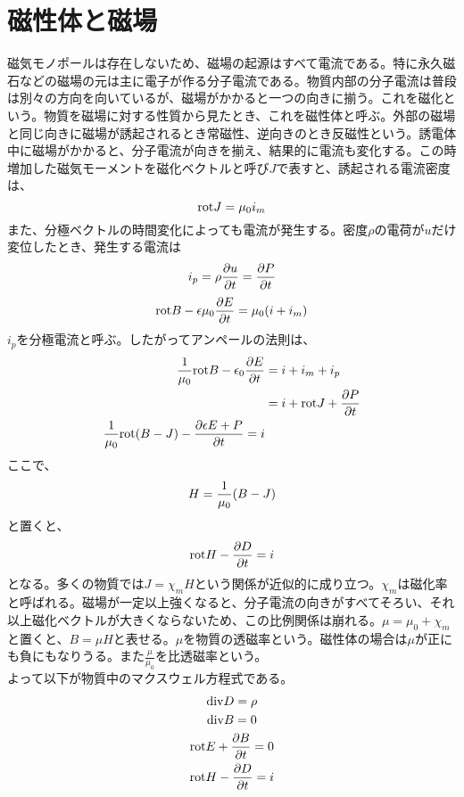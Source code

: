     \section{磁性体と磁場}
        磁気モノポールは存在しないため、磁場の起源はすべて電流である。特に永久磁石などの磁場の元は主に電子が作る分子電流である。物質内部の分子電流は普段は別々の方向を向いているが、磁場がかかると一つの向きに揃う。これを磁化という。物質を磁場に対する性質から見たとき、これを磁性体と呼ぶ。外部の磁場と同じ向きに磁場が誘起されるとき常磁性、逆向きのとき反磁性という。誘電体中に磁場がかかると、分子電流が向きを揃え、結果的に電流も変化する。この時増加した磁気モーメントを磁化ベクトルと呼び$J$で表すと、誘起される電流密度は、
            \[\rot J = \mu_0i_m\]
        また、分極ベクトルの時間変化によっても電流が発生する。密度$\rho$の電荷が$u$だけ変位したとき、発生する電流は
            \[i_p = \rho\pd[u]{t} = \pd[P]{t}\]
            \[\rot B - \epsilon\mu_0\pd[E]{t} = \mu_0 (i + i_m)\]
        $i_p$を分極電流と呼ぶ。したがってアンペールの法則は、
        \begin{align*}
            \rec{\mu_0}\rot B - \epsilon_0 \pd[E]{t} &= i + i_m + i_p\\
            &= i + \rot J + \pd[P]{t}\\
            \rec{\mu_0}\rot(B - J) - \pd[\epsilon E + P]{t} = i\\
        \end{align*}
        ここで、
            \[H = \rec{\mu_0}(B - J)\]
        と置くと、
            \[\rot H - \pd[D]{t} = i\]
        となる。多くの物質では$J = \chi_m H$という関係が近似的に成り立つ。$\chi_m$は磁化率と呼ばれる。磁場が一定以上強くなると、分子電流の向きがすべてそろい、それ以上磁化ベクトルが大きくならないため、この比例関係は崩れる。$\mu = \mu_0 + \chi_m$と置くと、$B = \mu H$と表せる。$\mu$を物質の透磁率という。磁性体の場合は$\mu$が正にも負にもなりうる。また$\frac{\mu}{\mu_0}$を比透磁率という。\\
    よって以下が物質中のマクスウェル方程式である。
    \begin{gather*}
        \dive D = \rho\\
        \dive B = 0\\
        \rot E + \pd[B]{t} = 0\\
        \rot H - \pd[D]{t} =  i
    \end{gather*}